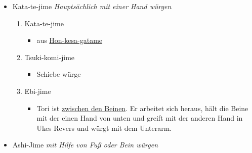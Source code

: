 \documentclass[justified, a4paper, notitlepage, captions=tableheading, nobib]{tufte-handout}
\begin{document}
\begin{itemize}
\item Kata-te-jime 
\emph{Hauptsächlich mit einer Hand würgen}

\begin{enumerate}
\item Kata-te-jime 
\begin{itemize}
\item aus \hyperref[orgac0a1d5]{Hon-kesa-gatame}
\end{itemize}
\item Tsuki-komi-jime 
\begin{itemize}
\item Schiebe würge
\end{itemize}
\item Ebi-jime 
\begin{itemize}
\item Tori ist \hyperref[orga527e99]{zwischen den Beinen}. Er arbeitet sich heraus, hält die Beine mit der einen Hand von unten und greift mit der anderen Hand in Ukes Revers und würgt mit dem Unterarm.
\end{itemize}
\end{enumerate}

\item Ashi-Jime 
\emph{mit Hilfe von Fuß oder Bein würgen}


\end{itemize}
\end{document}
